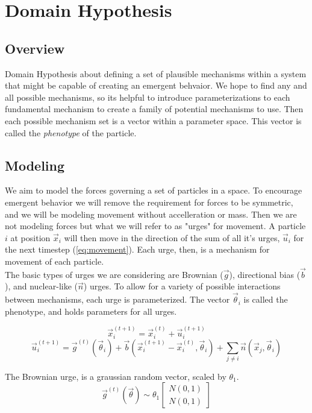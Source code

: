 \documentclass{article}
\begin{document}
\section{Domain Hypothesis}
\subsection{Overview}
Domain Hypothesis about defining a set of plausible mechanisms within a system that might be capable of creating an emergent behvaior. We hope to find any and all possible mechanisms, so its helpful to introduce parameterizations to each fundamental mechanism to create a family of potential mechanisms to use. Then each possible mechanism set is a vector within a parameter space. This vector is called the \textit{phenotype} of the particle.

\subsection{Modeling}
We aim to model the forces governing a set of particles in a space. To encourage emergent behavior we will remove the requirement for forces to be symmetric, and we will be modeling movement without accelleration or mass. Then we are not modeling forces but what we will refer to as "urges" for movement. A particle $i$ at position $\vec{x}_i$ will then move in the direction of the sum of all it's urges, $\vec{u}_i$ for the next timestep (\ref{eq:movement}). Each urge, then, is a mechanism for movement of each particle.\\
The basic types of urges we are considering are Brownian ($\vec{g}$), directional bias ($\vec{b}$), and nuclear-like ($\vec{n}$) urges. To allow for a variety of possible interactions between mechanisms, each urge is parameterized. The vector $\vec{\theta}_i$ is called the phenotype, and holds parameters for all urges.

\begin{equation}
    \label{eq:movement}
    \vec{x}^{(t+1)}_i= \vec{x}^{(t)}_i + \vec{u}^{(t+1)}_i
\end{equation}
\begin{equation}
    \vec{u}^{(t+1)}_i = \vec{g}^{(t)}(\vec{\theta}_i) + \vec{b}(\vec{x}^{(t+1)}_i -\vec{x}^{(t)}_i,\vec{\theta}_i) + \sum_{j \neq i}\vec{n}(\vec{x}_j, \vec{\theta}_i)
\end{equation}

The Brownian urge, is a graussian random vector, scaled by $\theta_1$.
\begin{equation}
    \vec{g}^{(t)}(\vec{\theta}) \sim \theta_1\begin{bmatrix} N(0,1)\\ N(0,1)\end{bmatrix}
\end{equation}
\end{document}
